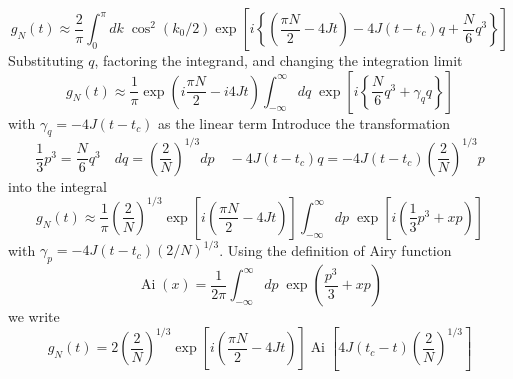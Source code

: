 \documentclass[../../../main.tex]{subfiles}
\begin{document}
\begin{equation*}
    g_N(t) \approx \frac{2}{\pi} \int_{0}^{\pi} dk \; \cos^2\left( k_0/2\right) \exp \left[ i \left\{ \left( \frac{\pi N}{2} - 4Jt \right) - 4J(t-t_c)q + \frac{N}{6}q^3 \right\} \right]
\end{equation*}
Substituting $q$, factoring the integrand, and changing the integration limit
\begin{equation*}
    g_N(t) \approx \frac{1}{\pi} \exp \left( i\frac{\pi N}{2} -i 4Jt \right) \int_{-\infty}^{\infty} dq \;  \exp \left[ i \left\{\frac{N}{6}q^3 +\gamma_q q  \right\} \right]
\end{equation*}
with $\gamma_q = -4J(t-t_c)$ as the linear term
Introduce the transformation
\begin{equation*}
    \frac{1}{3}p^3 = \frac{N}{6}q^3 \quad dq = \left(\frac{2}{N}\right)^{1/3}dp
    \quad -4J(t-t_c)q = -4J(t-t_c)\left(\frac{2}{N}\right)^{1/3}p
\end{equation*}
into the integral
\begin{equation*}
    g_N(t) \approx \frac{1}{\pi} \left(\frac{2}{N}\right)^{1/3} \exp \left[ i \left( \frac{\pi N}{2} - 4Jt \right) \right] \int_{-\infty}^{\infty} dp \; \exp \left[ i \left( \frac{1}{3}p^3 + xp \right) \right]
\end{equation*}
with $\gamma_p = -4J(t-t_c)(2/N) ^{1/3}$.
Using the definition of Airy function
\begin{equation*}
    \operatorname{Ai} (x) = \frac{1 }{2\pi} \int_{-\infty }^{\infty } dp\; \exp \left( \frac{p ^3}{3 } + xp \right)
\end{equation*}
we write
\begin{equation*}
    g_N(t)= 2\left(\frac{2}{N}\right)^{1/3} \exp \left[ i \left( \frac{\pi N}{2} - 4Jt \right) \right] \operatorname{Ai}\left[ 4J(t_c - t) \left( \frac{2 }{N }\right) ^{1/3}   \right]
\end{equation*}
\end{document}
